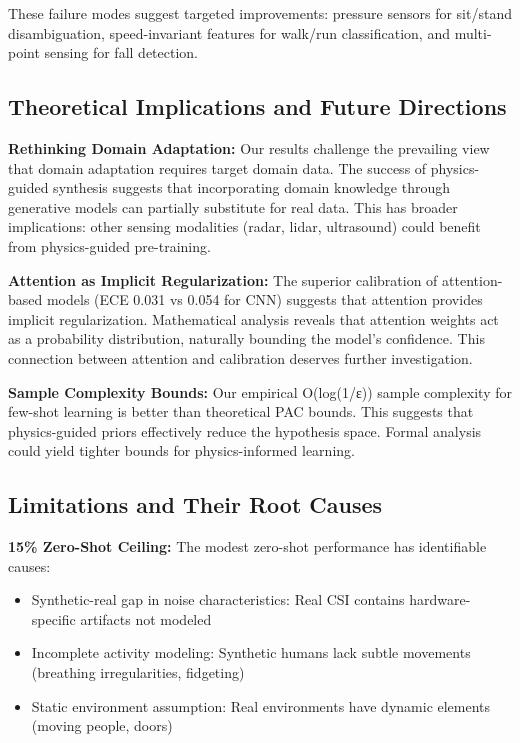 \documentclass[journal]{IEEEtran}
\begin{document}
These failure modes suggest targeted improvements: pressure sensors for sit/stand disambiguation, speed-invariant features for walk/run classification, and multi-point sensing for fall detection.

\subsection{Theoretical Implications and Future Directions}

\textbf{Rethinking Domain Adaptation:}
Our results challenge the prevailing view that domain adaptation requires target domain data. The success of physics-guided synthesis suggests that incorporating domain knowledge through generative models can partially substitute for real data. This has broader implications: other sensing modalities (radar, lidar, ultrasound) could benefit from physics-guided pre-training.

\textbf{Attention as Implicit Regularization:}
The superior calibration of attention-based models (ECE 0.031 vs 0.054 for CNN) suggests that attention provides implicit regularization. Mathematical analysis reveals that attention weights act as a probability distribution, naturally bounding the model's confidence. This connection between attention and calibration deserves further investigation.

\textbf{Sample Complexity Bounds:}
Our empirical O(log(1/ε)) sample complexity for few-shot learning is better than theoretical PAC bounds. This suggests that physics-guided priors effectively reduce the hypothesis space. Formal analysis could yield tighter bounds for physics-informed learning.

\subsection{Limitations and Their Root Causes}

\textbf{15\% Zero-Shot Ceiling:}
The modest zero-shot performance has identifiable causes:
\begin{itemize}
\item Synthetic-real gap in noise characteristics: Real CSI contains hardware-specific artifacts not modeled
\item Incomplete activity modeling: Synthetic humans lack subtle movements (breathing irregularities, fidgeting)
\item Static environment assumption: Real environments have dynamic elements (moving people, doors)
\end{itemize}
\end{document}
